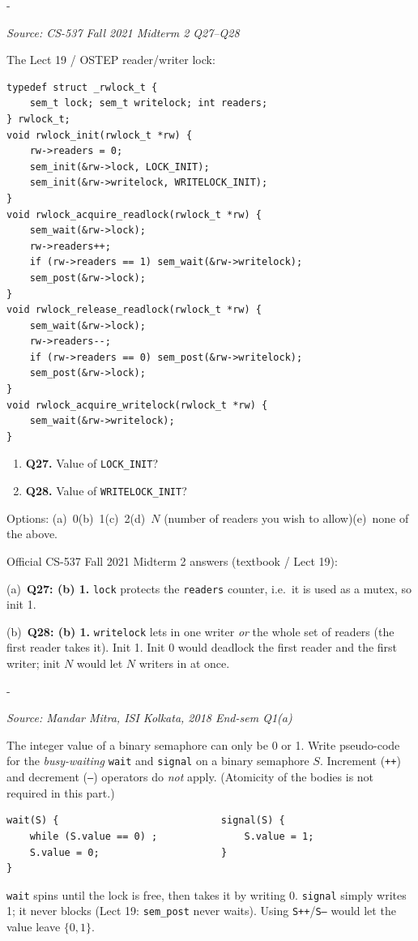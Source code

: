 \documentclass[11pt,a4paper]{article}
\makeatletter
\newcommand{\keepspace}[1]{\par\penalty-100\begingroup
  \setlength{\dimen@}{#1}\dimen@ii\pagegoal\advance\dimen@ii-\pagetotal
  \ifdim\dimen@>\dimen@ii\ifdim\dimen@ii>\z@\vfil\fi\break\fi\endgroup}
\newcounter{qn}[section]
\newenvironment{Qn}[4]{%
  \refstepcounter{qn}\keepspace{7\baselineskip}%
  \begin{tcolorbox}[qboxstyle, title={Q\thesection.\theqn\ \ [#1 \textbar\ #2]\ \ #4}]%
  {\footnotesize\color{g3}\textit{Source: #3}}\par\smallskip%
}{%
  \end{tcolorbox}%
}
\newenvironment{Sol}{%
  \begin{tcolorbox}[sboxstyle, title={Solution}]%
}{%
  \end{tcolorbox}\vspace{0.35em}%
}
\makeatother
\begin{document}
\begin{Qn}{Easy-Medium}{Lect 19}{CS-537 Fall 2021 Midterm 2 Q27--Q28}{Reader/writer lock: \texttt{LOCK\_INIT} and \texttt{WRITELOCK\_INIT}}
The Lect 19 / OSTEP reader/writer lock:
\begin{lstlisting}[numbers=none]
typedef struct _rwlock_t {
    sem_t lock; sem_t writelock; int readers;
} rwlock_t;
void rwlock_init(rwlock_t *rw) {
    rw->readers = 0;
    sem_init(&rw->lock, LOCK_INIT);
    sem_init(&rw->writelock, WRITELOCK_INIT);
}
void rwlock_acquire_readlock(rwlock_t *rw) {
    sem_wait(&rw->lock);
    rw->readers++;
    if (rw->readers == 1) sem_wait(&rw->writelock);
    sem_post(&rw->lock);
}
void rwlock_release_readlock(rwlock_t *rw) {
    sem_wait(&rw->lock);
    rw->readers--;
    if (rw->readers == 0) sem_post(&rw->writelock);
    sem_post(&rw->lock);
}
void rwlock_acquire_writelock(rwlock_t *rw) {
    sem_wait(&rw->writelock);
}
\end{lstlisting}
\begin{enumerate}
  \item[(a)] \textbf{Q27.} Value of \texttt{LOCK\_INIT}?
  \item[(b)] \textbf{Q28.} Value of \texttt{WRITELOCK\_INIT}?
\end{enumerate}
Options: (a)~0\quad (b)~1\quad (c)~2\quad (d)~$N$ (number of readers you
wish to allow)\quad (e)~none of the above.
\end{Qn}
\begin{Sol}
Official CS-537 Fall 2021 Midterm 2 answers (textbook / Lect 19):

(a)~\textbf{Q27: (b) 1.} \texttt{lock} protects the \texttt{readers}
counter, i.e.\ it is used as a mutex, so init 1.

(b)~\textbf{Q28: (b) 1.} \texttt{writelock} lets in one writer \emph{or}
the whole set of readers (the first reader takes it). Init 1. Init 0
would deadlock the first reader and the first writer; init $N$ would
let $N$ writers in at once.
\end{Sol}

\begin{Qn}{Easy-Medium}{Lect 19}{Mandar Mitra, ISI Kolkata, 2018 End-sem Q1(a)}{Busy-wait binary wait and signal}
The integer value of a binary semaphore can only be 0 or 1. Write
pseudo-code for the \emph{busy-waiting} \texttt{wait} and
\texttt{signal} on a binary semaphore $S$. Increment (\texttt{++}) and
decrement (\texttt{--}) operators do \emph{not} apply. (Atomicity of
the bodies is not required in this part.)
\end{Qn}
\begin{Sol}
\begin{lstlisting}[numbers=none]
wait(S) {                            signal(S) {
    while (S.value == 0) ;               S.value = 1;
    S.value = 0;                     }
}
\end{lstlisting}
\texttt{wait} spins until the lock is free, then takes it by writing 0.
\texttt{signal} simply writes 1; it never blocks (Lect 19:
\texttt{sem\_post} never waits). Using \texttt{S++}/\texttt{S--} would
let the value leave $\{0,1\}$.
\end{Sol}
\end{document}

